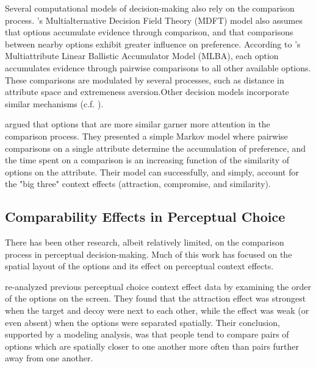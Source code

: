 Several computational models of decision-making also rely on the comparison process.  \textcite{roeMultialternativeDecisionField2001a}'s Multialternative Decision Field Theory (MDFT) model also assumes that options accumulate evidence through comparison, and that comparisons between nearby options exhibit greater influence on preference. According to \textcite{trueblood2014multiattribute}'s Multiattribute Linear Ballistic Accumulator Model (MLBA), each option accumulates evidence through pairwise comparisons to all other available options. These comparisons are modulated by several processes, such as distance in attribute space and extremeness aversion.Other decision models incorporate similar mechanisms \parencite{usherLossAversionInhibition2004a,noguchiMultialternativeDecisionSampling2018a,wollschlager2NaryChoiceTree2012a,landry2021pairwise} (c.f. \textcite{bhatiaAssociationsAccumulationPreference2013b,bergnerVAMPVotingAgent2019b}). 

\textcite{trueblood2022attentional} argued that options that are more similar garner more attention in the comparison process. They presented a simple Markov model where pairwise comparisons on a single attribute determine the accumulation of preference, and the time spent on a comparison is an increasing function of the similarity of options on the attribute. Their model can successfully, and simply, account for the "big three" context effects (attraction, compromise, and similarity).

\subsection{Comparability Effects in Perceptual Choice}
There has been other research, albeit relatively limited, on the comparison process in perceptual decision-making. Much of this work has focused on the spatial layout of the options and its effect on perceptual context effects.

\textcite{trueblood2022attentional} re-analyzed previous perceptual choice context effect data \parencite{trueblood2015fragile} by examining the order of the options on the screen. They found that the attraction effect was strongest when the target and decoy were next to each other, while the effect was weak (or even absent) when the options were separated spatially. Their conclusion, supported by a modeling analysis, was that people tend to compare pairs of options which are spatially closer to one another more often than pairs further away from one another. 

